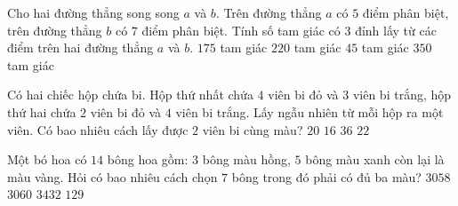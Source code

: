 \begin{ex}%
	Cho hai đường thẳng song song $a$ và $b$. Trên đường thẳng $a$ có $5$ điểm phân biệt, trên đường thẳng $b$ có $7$ điểm phân biệt. Tính số tam giác có $3$ đỉnh lấy từ các điểm trên hai đường thẳng $a$ và $b$.
	\choice
	{\True $175$ tam giác}
	{$220$ tam giác}
	{$45$ tam giác}
	{$350$ tam giác}
\end{ex}
\begin{ex}%
	Có hai chiếc hộp chứa bi. Hộp thứ nhất chứa $4$ viên bi đỏ và $3$ viên bi trắng, hộp thứ hai chứa $2$ viên bi đỏ và $4$ viên bi trắng. Lấy ngẫu nhiên từ mỗi hộp ra một viên. Có bao nhiêu cách lấy được $2$ viên bi cùng màu?
	\choice
	{\True $20$}
	{$16$}
	{$36$}
	{$22$}
\end{ex}
\begin{ex}%
	Một bó hoa có $14$ bông hoa gồm: $3$ bông màu hồng, $5$ bông màu xanh còn lại là màu vàng. Hỏi có bao nhiêu cách chọn $7$ bông trong đó phải có đủ ba màu?
	\choice
	{\True $3058$}
	{$3060$}
	{$3432$}
	{$129$}
\end{ex}

